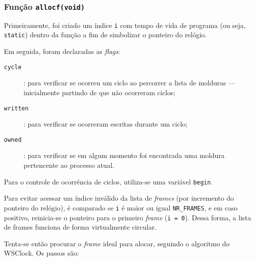\documentclass{article}
\begin{document}
\subsubsection{Função \texttt{allocf(void)}}

Primeiramente, foi criado um índice \texttt{i} com tempo de vida de programa
(ou seja, \texttt{static}) dentro da função a fim de simbolizar o ponteiro do
relógio.

Em seguida, foram declaradas as \textit{flags}:

\begin{description}
    \item[\texttt{cycle}]: para verificar se ocorreu um ciclo ao percorrer a
        lista de molduras --- inicialmente partindo de que não ocorreram
        ciclos;
    \item[\texttt{written}]: para verificar se ocorreram escritas durante um
        ciclo;
    \item[\texttt{owned}]: para verificar se em algum momento foi encontrada
        uma moldura pertencente ao processo atual.
\end{description}

Para o controle de ocorrência de ciclos, utiliza-se uma variável
\texttt{begin}.

Para evitar acessar um índice inválido da lista de \textit{frames} (por
incremento do ponteiro do relógio), é comparado se \texttt{i} é maior ou igual
\texttt{NR\_FRAMES}, e em caso positivo, reinicia-se o ponteiro para o primeiro
\textit{frame} (\texttt{i = 0}). Dessa forma, a lista de frames funciona de
forma virtualmente circular.

Tenta-se então procurar o \textit{frame} ideal para alocar, seguindo o
algoritmo do WSClock. Os passos são:
\end{document}
